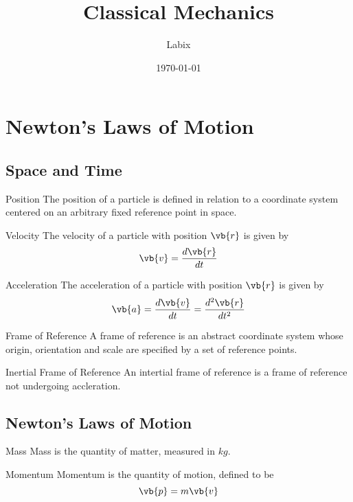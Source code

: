 \documentclass[a4paper]{article}
\title{Classical Mechanics}
\author{Labix}
\date{\today}
\begin{document}
\maketitle
\begin{abstract}
\end{abstract}
\pagebreak
\tableofcontents

\pagebreak
\section{Newton's Laws of Motion}
\subsection{Space and Time}
\begin{defn}{Position}{} The position of a particle is defined in relation to a coordinate system centered on an arbitrary fixed reference point in space. 
\end{defn}

\begin{defn}{Velocity}{} The velocity of a particle with position $\vb{r}$ is given by $$\vb{v}=\frac{d\vb{r}}{dt}$$
\end{defn}

\begin{defn}{Acceleration}{} The acceleration of a particle with position $\vb{r}$ is given by $$\vb{a}=\frac{d\vb{v}}{dt}=\frac{d^2\vb{r}}{dt^2}$$
\end{defn}

\begin{defn}{Frame of Reference}{} A frame of reference is an abstract coordinate system whose origin, orientation and scale are specified by a set of reference points. 
\end{defn}

\begin{defn}{Inertial Frame of Reference}{} An intertial frame of reference is a frame of reference not undergoing accleration. 
\end{defn}

\subsection{Newton's Laws of Motion}
\begin{defn}{Mass}{} Mass is the quantity of matter, measured in $kg$. 
\end{defn}

\begin{defn}{Momentum}{} Momentum is the quantity of motion, defined to be $$\vb{p}=m\vb{v}$$
\end{defn}
\end{document}
